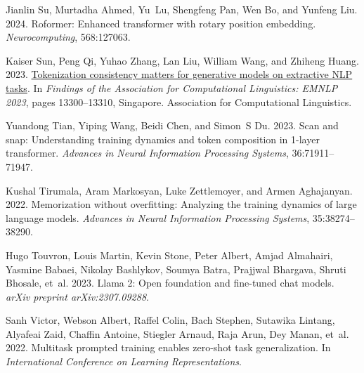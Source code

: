 \documentclass[11pt]{article}
\begin{document}
\begin{thebibliography}{88}
    Jianlin Su, Murtadha Ahmed, Yu~Lu, Shengfeng Pan, Wen Bo, and Yunfeng Liu. 2024.
    \newblock Roformer: Enhanced transformer with rotary position embedding.
    \newblock \emph{Neurocomputing}, 568:127063.
    
    Kaiser Sun, Peng Qi, Yuhao Zhang, Lan Liu, William Wang, and Zhiheng Huang. 2023.
    \newblock \href {https://doi.org/10.18653/v1/2023.findings-emnlp.887} {Tokenization consistency matters for generative models on extractive {NLP} tasks}.
    \newblock In \emph{Findings of the Association for Computational Linguistics: EMNLP 2023}, pages 13300--13310, Singapore. Association for Computational Linguistics.
    
    Yuandong Tian, Yiping Wang, Beidi Chen, and Simon~S Du. 2023.
    \newblock Scan and snap: Understanding training dynamics and token composition in 1-layer transformer.
    \newblock \emph{Advances in Neural Information Processing Systems}, 36:71911--71947.
    
    Kushal Tirumala, Aram Markosyan, Luke Zettlemoyer, and Armen Aghajanyan. 2022.
    \newblock Memorization without overfitting: Analyzing the training dynamics of large language models.
    \newblock \emph{Advances in Neural Information Processing Systems}, 35:38274--38290.
    
    Hugo Touvron, Louis Martin, Kevin Stone, Peter Albert, Amjad Almahairi, Yasmine Babaei, Nikolay Bashlykov, Soumya Batra, Prajjwal Bhargava, Shruti Bhosale, et~al. 2023.
    \newblock Llama 2: Open foundation and fine-tuned chat models.
    \newblock \emph{arXiv preprint arXiv:2307.09288}.
    
    Sanh Victor, Webson Albert, Raffel Colin, Bach Stephen, Sutawika Lintang, Alyafeai Zaid, Chaffin Antoine, Stiegler Arnaud, Raja Arun, Dey Manan, et~al. 2022.
    \newblock Multitask prompted training enables zero-shot task generalization.
    \newblock In \emph{International Conference on Learning Representations}.
    

\end{thebibliography}
\end{document}
